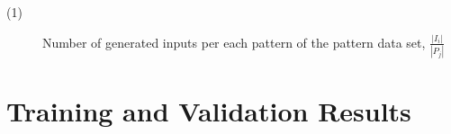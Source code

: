 \documentclass[12pt]{article}
\begin{document}
\begin{appendices}
        \begin{description}
        \item [(1)] Number of generated inputs per each pattern of the pattern data set, $\frac{\left|I_i\right|}{\left|P_j\right|}$
        \end {description}
        
\section{Training and Validation Results}


    \begin{table}[H]
    \centering
    \def\arraystretch{1.5}
    \scriptsize
    \begin{tabular}{ccccc}
    

\end{tabular}
\end{table}
\end{appendices}
\end{document}
